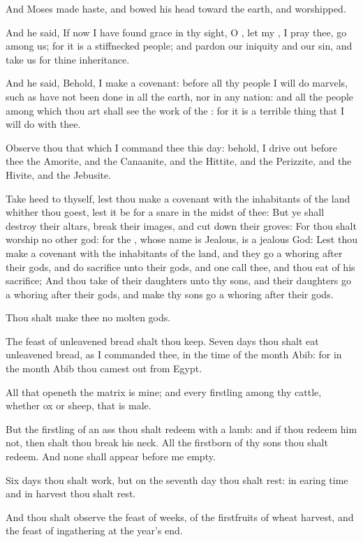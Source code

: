 \verse And Moses made haste, and bowed his head toward the earth, and worshipped.

\verse And he said, If now I have found grace in thy sight, O \LORD, let my \LORD, I pray thee, go among us; for it is a stiffnecked people; and pardon our iniquity and our sin, and take us for thine inheritance.

\verse And he said, Behold, I make a covenant: before all thy people I will do marvels, such as have not been done in all the earth, nor in any nation: and all the people among which thou art shall see the work of the \LORD: for it is a terrible thing that I will do with thee.

\verse Observe thou that which I command thee this day: behold, I drive out before thee the Amorite, and the Canaanite, and the Hittite, and the Perizzite, and the Hivite, and the Jebusite.

\verse Take heed to thyself, lest thou make a covenant with the inhabitants of the land whither thou goest, lest it be for a snare in the midst of thee: \verse But ye shall destroy their altars, break their images, and cut down their groves: \verse For thou shalt worship no other god: for the \LORD, whose name is Jealous, is a jealous God: \verse Lest thou make a covenant with the inhabitants of the land, and they go a whoring after their gods, and do sacrifice unto their gods, and one call thee, and thou eat of his sacrifice; \verse And thou take of their daughters unto thy sons, and their daughters go a whoring after their gods, and make thy sons go a whoring after their gods.

\verse Thou shalt make thee no molten gods.

\verse The feast of unleavened bread shalt thou keep. Seven days thou shalt eat unleavened bread, as I commanded thee, in the time of the month Abib: for in the month Abib thou camest out from Egypt.

\verse All that openeth the matrix is mine; and every firstling among thy cattle, whether ox or sheep, that is male.

\verse But the firstling of an ass thou shalt redeem with a lamb: and if thou redeem him not, then shalt thou break his neck. All the firstborn of thy sons thou shalt redeem. And none shall appear before me empty.

\verse Six days thou shalt work, but on the seventh day thou shalt rest: in earing time and in harvest thou shalt rest.

\verse And thou shalt observe the feast of weeks, of the firstfruits of wheat harvest, and the feast of ingathering at the year's end.

